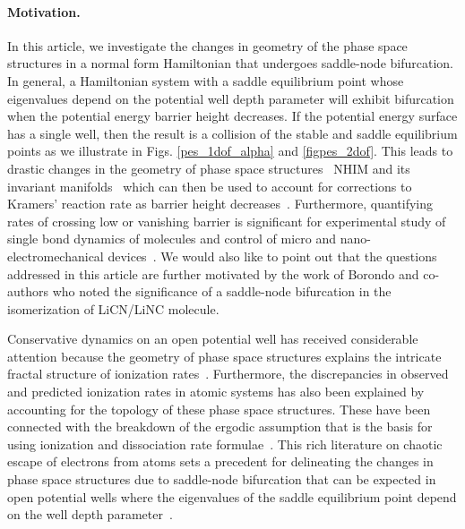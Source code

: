 \documentclass{ws-ijbc}
\begin{document}
\paragraph*{\bf Motivation.} %
In this article, we investigate the changes in geometry of the phase space structures in a normal form Hamiltonian that undergoes saddle-node bifurcation. In general, a Hamiltonian system with a saddle equilibrium point whose eigenvalues depend on the potential well depth parameter will exhibit  bifurcation when the potential energy barrier height decreases. If the potential energy surface has a single well, then the result is a collision of the stable and saddle equilibrium points as we illustrate in Figs. \ref{pes_1dof_alpha} and \ref{figpes_2dof}. This leads to drastic changes in the geometry of phase space structures \textemdash~NHIM and its invariant manifolds \textemdash~which can then be used to account for corrections to Kramers' reaction rate as barrier height decreases~\cite{hathcock2019renormalization}. Furthermore, quantifying rates of crossing low or vanishing barrier is significant for experimental study of single bond dynamics of molecules and control of micro and nano-electromechanical devices~\cite{hathcock2019renormalization,husson2009force,miller2012escape,herbert2017predictability}. We would also like to point out that the questions addressed in this article are further motivated by the work of Borondo and co-authors \cite{borondo1995,borondo1996,revuelta2019unveiling}	 who noted the significance of a saddle-node bifurcation in the isomerization of LiCN/LiNC molecule. 

Conservative dynamics on an open potential well has received considerable attention because the geometry of phase space structures explains the intricate fractal structure of ionization 
rates~\cite{mitchell_geometry_2003_I,mitchell_geometry_2003_II,mitchell_chaos-induced_2004}. 
Furthermore, the discrepancies in observed and predicted ionization rates in atomic systems has 
also been explained by accounting for the topology of these phase space structures. These have been connected with the breakdown of the ergodic assumption that is the basis for using ionization and dissociation rate formulae~\cite{de_leon_intramolecular_1981}. This rich literature on chaotic escape of electrons from atoms sets a precedent for delineating the changes in phase space structures due to saddle-node bifurcation that can be expected in open potential wells where the eigenvalues of the saddle equilibrium point depend on the well depth parameter~\cite{mitchell_analysis_2004,mitchell_chaos-induced_2004,mitchell_nonlinear_2009,mitchell_structure_2007,wang_photoionization_2010}. 
\end{document}
